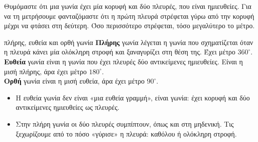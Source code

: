 
Θυμόμαστε ότι μια γωνία έχει μία κορυφή και δύο πλευρές, που είναι ημιευθείες. Για να τη μετρήσουμε φανταζόμαστε ότι η πρώτη πλευρά στρέφεται γύρω από την κορυφή μέχρι να φτάσει στη δεύτερη. Όσο περισσότερο στρέφεται, τόσο μεγαλύτερο το μέτρο.

\begin{orismos}{πλήρης, ευθεία και ορθή γωνία}
\textbf{Πλήρης} γωνία λέγεται η γωνία που σχηματίζεται όταν η πλευρά κάνει μία ολόκληρη στροφή και ξαναγυρίζει στη θέση της. Έχει μέτρο $360^\circ$.\\
\textbf{Ευθεία} γωνία είναι η γωνία που έχει πλευρές δύο αντικείμενες ημιευθείες. Είναι η μισή πλήρης, άρα έχει μέτρο $180^\circ$.\\
\textbf{Ορθή} γωνία είναι η μισή ευθεία, άρα έχει μέτρο $90^\circ$.
\end{orismos}

\begin{center}
\end{center}

\begin{prosoxi}
\begin{itemize}[leftmargin=1.2em,itemsep=0.3ex,topsep=2pt]
\item Η ευθεία γωνία δεν είναι «μια ευθεία γραμμή», είναι γωνία: έχει κορυφή και δύο αντικείμενες ημιευθείες ως πλευρές.
\item Στην πλήρη γωνία οι δύο πλευρές συμπίπτουν, όπως και στη μηδενική. Τις ξεχωρίζουμε από το πόσο «γύρισε» η πλευρά: καθόλου ή ολόκληρη στροφή.
\end{itemize}
\end{prosoxi}

